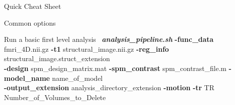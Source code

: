 \documentclass[]{article}
\begin{document}
\begin{section}{Quick Cheat Sheet}
\begin{subsection}{Common options}
\begin{description}
\end{description}
\end{subsection}
\begin{subsection}{Run a basic first level analysis}
\
{\it \bf analysis\_pipeline.sh}   {\bf -func\_data} fmri\_4D.nii.gz  {\bf -t1} structural\_image.nii.gz  {\bf -reg\_info} structural\_image.struct\_extension   \\
\hspace*{1.3in} {\bf -design} spm\_design\_matrix.mat  {\bf -spm\_contrast}  spm\_contrast\_file.m  {\bf -model\_name} name\_of\_model   \\
\hspace*{1.3in} {\bf -output\_extension} analysis\_directory\_extension  {\bf -motion}  {\bf -tr} TR  \\
\hspace*{1.3in}{\bf -deleteVolumes} Number\_of\_Volumes\_to\_Delete
\end{subsection}

\end{section}
\end{document}
